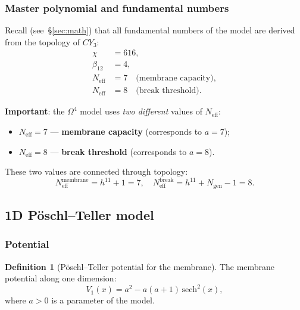 \documentclass[11pt,a4paper]{article}
\newcommand{\CY}{\ensuremath{CY_3}}
\newcommand{\Om}{\ensuremath{\Omega^4}}
\theoremstyle{definition}
\newtheorem{definition}[theorem]{Definition}
\begin{document}
\subsubsection{Master polynomial and fundamental numbers}

Recall (see~\S\ref{sec:math}) that all fundamental numbers
of the model are derived from the topology of $\CY$:
\begin{align}
    \chi &= 616, \\
    \beta_{12} &= 4, \\
    N_{\text{eff}} &= 7 \quad \text{(membrane capacity)}, \\
    N_{\text{eff}} &= 8 \quad \text{(break threshold)}.
\end{align}

\medskip\noindent
\textbf{Important}: the $\Om$ model uses \emph{two different}
values of $N_{\text{eff}}$:
\begin{itemize}
    \item $N_{\text{eff}} = 7$ --- \textbf{membrane capacity}
          (corresponds to $a = 7$);
    \item $N_{\text{eff}} = 8$ --- \textbf{break threshold}
          (corresponds to $a = 8$).
\end{itemize}
These two values are connected through topology:
\begin{equation}
    N_{\text{eff}}^{\text{membrane}} = h^{11} + 1 = 7, \quad
    N_{\text{eff}}^{\text{break}} = h^{11} + N_{\text{gen}} - 1 = 8.
\end{equation}

\subsection{1D P\"oschl--Teller model}
\label{subsec:membrane-1D}

\subsubsection{Potential}

\begin{definition}[P\"oschl--Teller potential for the membrane]
\label{def:membrane-pt}
The membrane potential along one dimension:
\begin{equation}
    \boxed{
    V_1(x) = a^2 - a(a+1) \, \mathrm{sech}^2(x),
    }
    \label{eq:membrane-V1}
\end{equation}
where $a > 0$ is a parameter of the model.
\end{definition}
\end{document}
